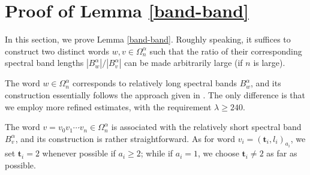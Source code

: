 \documentclass[reqno,11pt,graphicx,]{amsart}
\numberwithin{equation}{section}
\theoremstyle{plain}
\newcommand{\3}{\mathbf{3}}
\begin{document}
	\section{Proof of Lemma \ref{band-band}}\label{imp-lemma}
	
	In this section, we prove Lemma \ref{band-band}. Roughly speaking, it suffices to construct two distinct words $w,v\in\Omega^{\alpha}_{n}$ such that the ratio of their corresponding spectral band lengths $|B^{\alpha}_{w}|/|B^{\alpha}_{v}|$ can be made arbitrarily large (if $n$ is large).
	
	The word $w\in\Omega^{\alpha}_{n}$ corresponds to relatively long spectral bands $B^{\alpha}_w$, and its construction essentially follows the approach given in \cite[Proposition 3.4]{DGLQ2015}. The only difference is that we employ more refined estimates, with the requirement $\lambda\geq240$.
	
	The	word $v=v_0v_1\cdots v_{n}\in\Omega^{\alpha}_{n}$ is associated with the relatively short spectral band $B^{\alpha}_v$, and its construction is rather straightforward. As for word $v_i=(\mathbf{t}_i,l_i)_{a_i}$, we set $\mathbf{t}_i=2$ whenever possible if $a_i\ge 2$; while if $a_i=1$, we choose $\mathbf{t}_i\ne 2$ as far as possible.
	
\end{document}

